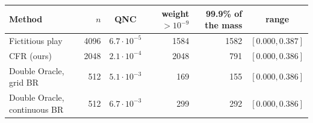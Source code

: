 \begin{tabular}{lrcrrc}
\toprule
Method & $n$ & QNC & weight $>10^{-9}$ & 99.9\% of the mass & range \\
\midrule
Fictitious play & 4096 & $6.7\cdot10^{-5}$ & 1584 & 1582 & $[0.000, 0.387]$ \\
CFR (ours) & 2048 & $2.1\cdot10^{-4}$ & 2048 & 791 & $[0.000, 0.386]$ \\
Double Oracle, grid BR & 512 & $5.1\cdot10^{-3}$ & 169 & 155 & $[0.000, 0.386]$ \\
Double Oracle, continuous BR & 512 & $6.7\cdot10^{-3}$ & 299 & 292 & $[0.000, 0.386]$ \\
\bottomrule
\end{tabular}
